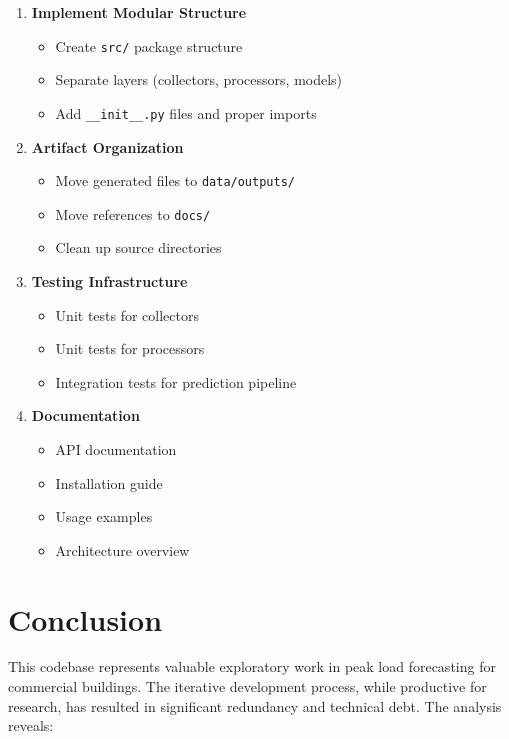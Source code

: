 \documentclass[11pt,a4paper]{article}
\begin{document}
\begin{enumerate}
    \item \textbf{Implement Modular Structure}
    \begin{itemize}
        \item Create \texttt{src/} package structure
        \item Separate layers (collectors, processors, models)
        \item Add \texttt{\_\_init\_\_.py} files and proper imports
    \end{itemize}
    
    \item \textbf{Artifact Organization}
    \begin{itemize}
        \item Move generated files to \texttt{data/outputs/}
        \item Move references to \texttt{docs/}
        \item Clean up source directories
    \end{itemize}
    
    \item \textbf{Testing Infrastructure}
    \begin{itemize}
        \item Unit tests for collectors
        \item Unit tests for processors
        \item Integration tests for prediction pipeline
    \end{itemize}
    
    \item \textbf{Documentation}
    \begin{itemize}
        \item API documentation
        \item Installation guide
        \item Usage examples
        \item Architecture overview
    \end{itemize}
\end{enumerate}

\section{Conclusion}

This codebase represents valuable exploratory work in peak load forecasting for commercial buildings. The iterative development process, while productive for research, has resulted in significant redundancy and technical debt. The analysis reveals:
\end{document}
